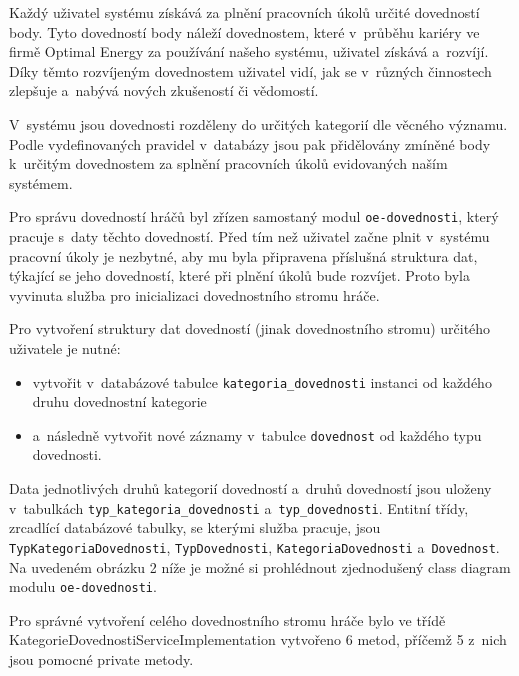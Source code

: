 \documentclass[12pt]{article}
\begin{document}
{\clearpage


Každý uživatel systému získává za plnění pracovních úkolů určité dovedností body. Tyto dovedností body náleží dovednostem, které v~průběhu kariéry ve firmě Optimal Energy za používání našeho systému, uživatel získává a~rozvíjí. Díky těmto rozvíjeným dovednostem uživatel vidí, jak se v~různých činnostech zlepšuje a~nabývá nových zkušeností či vědomostí. 

V~systému jsou dovednosti rozděleny do určitých kategorií dle věcného významu. Podle vydefinovaných pravidel v~databázy jsou pak přidělovány zmíněné body k~určitým dovednostem za splnění pracovních úkolů evidovaných naším systémem.

Pro správu dovedností hráčů byl zřízen samostaný modul \texttt{oe-dovednosti}, který pracuje s~daty těchto dovedností. Před tím než uživatel začne plnit v~systému pracovní úkoly je nezbytné, aby mu byla připravena příslušná struktura dat, týkající se jeho dovedností, které při plnění úkolů bude rozvíjet. Proto byla vyvinuta služba pro inicializaci dovednostního stromu hráče.


Pro vytvoření struktury dat dovedností (jinak dovednostního stromu) určitého uživatele je nutné:

\begin{itemize}

\item vytvořit v~databázové tabulce \texttt{kategoria\_dovednosti} instanci od každého druhu dovednostní kategorie
\item  a~následně vytvořit nové záznamy v~tabulce \texttt{dovednost} od každého typu dovednosti.
\end{itemize}

Data jednotlivých druhů kategorií dovedností a~druhů dovedností jsou uloženy v~tabulkách \texttt{typ\_kategoria\_dovednosti} a~\texttt{typ\_dovednosti}.
Entitní třídy, zrcadlící databázové tabulky, se kterými služba pracuje, jsou \texttt{TypKategoriaDovednosti}, \texttt{TypDovednosti}, \texttt{KategoriaDovednosti} a~\texttt{Dovednost}. Na uvedeném obrázku 2 níže je možné si prohlédnout zjednodušený class diagram modulu \texttt{oe-dovednosti}. 

\clearpage

\obrazek
{}

Pro správné vytvoření celého dovednostního stromu hráče bylo ve třídě KategorieDovednostiServiceImplementation vytvořeno 6 metod, příčemž 5 z~nich jsou pomocné private metody.

}
\end{document}
